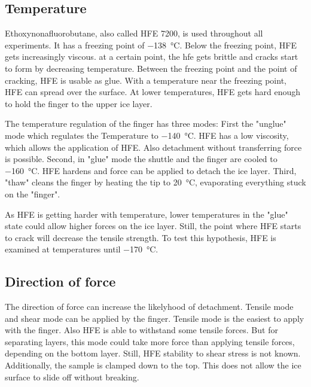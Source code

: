 


\subsection{Temperature}

Ethoxynonafluorobutane, also called HFE 7200, is used throughout all experiments. It has a freezing point of \SI{-138}{\degreeCelsius}. Below the freezing point, HFE gets increasingly viscous. at a certain point, the hfe gets brittle and cracks start to form by decreasing temperature. Between the freezing point and the point of cracking, HFE is usable as glue. With a temperature near the freezing point, HFE can spread over the surface. At lower temperatures, HFE gets hard enough to hold the finger to the upper ice layer.

The temperature regulation of the finger has three modes: First the "unglue" mode which regulates the Temperature to \SI{-140}{\degreeCelsius}. HFE has a low viscosity, which allows the application of HFE. Also detachment without transferring force is possible. Second, in "glue" mode the shuttle and the finger are cooled to \SI{-160}{\degreeCelsius}. HFE hardens and force can be applied to detach the ice layer. Third, "thaw" cleans the finger by heating the tip to \SI{20}{\degreeCelsius}, evaporating everything stuck on the "finger". 

As HFE is getting harder with temperature, lower temperatures in the "glue" state could allow higher forces on the ice layer. Still, the point where HFE starts to crack will decrease the tensile strength. To test this hypothesis, HFE is examined at temperatures until \SI{-170}{\degreeCelsius}.

\subsection{Direction of force}

The direction of force can increase the likelyhood of detachment. Tensile mode and shear mode can be applied by the finger. Tensile mode is the easiest to apply with the finger. Also HFE is able to withstand some tensile forces. But for separating layers, this mode could take more force than applying tensile forces, depending on the bottom layer. Still, HFE stability to shear stress is not known. Additionally, the sample is clamped down to the top. This does not allow the ice surface to slide off without breaking.

